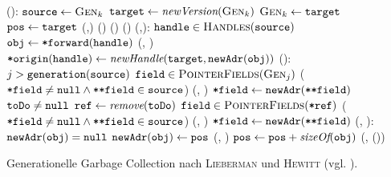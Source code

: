 \begin{algorithm}[h!]
\begin{algorithmic}[1]
	\State {}():
	\State \quad $\texttt{source} \gets \textsc{Gen}_k$
	\State \quad $\texttt{target} \gets \textit{newVersion}(\textsc{Gen}_k)$		
	\State \quad $\textsc{Gen}_k \gets \texttt{target}$
	\State \quad $\texttt{pos} \gets \texttt{target}$
	\State \quad {}(,)		
	\State \quad {}()		
	\State \quad {}()
	\State \quad {}()		
	\Statex
	\State {}(,):
	\State \quad \FOREACH $\texttt{handle} \in \textsc{Handles}(\texttt{source})$		
	\State \quad \quad $\texttt{obj} \gets \texttt{*forward}(\texttt{handle})$
	\State \quad \quad {}(, )
	\State \quad \quad $\texttt{*origin}(\texttt{handle}) \gets \textit{newHandle}(\texttt{target}, \texttt{newAdr}(\texttt{obj}))$
	\Statex
	\State {}():
	\State \quad \FOREACH $j > \texttt{generation}(\texttt{source})$		
	\State \quad \quad \FOREACH $\texttt{field} \in \textsc{PointerFields}(\textsc{Gen}_j)$	
	\State \quad \quad \quad \IF ($\texttt{*field} \neq \texttt{null} \wedge \texttt{**field} \in \texttt{source}$)
	\State \quad \quad \quad \quad {}(, )
	\State \quad \quad \quad \quad $\texttt{*field} \gets \texttt{newAdr}(\texttt{**field})$
	\State \quad \WHILE $\texttt{toDo} \neq \texttt{null}$
	\State \quad \quad $\texttt{ref} \gets \textit{remove}(\texttt{toDo})$
	\State \quad \quad \FOREACH $\texttt{field} \in \textsc{PointerFields}(\texttt{*ref})$	
	\State \quad \quad \quad \IF ($\texttt{*field} \neq \texttt{null} \wedge \texttt{**field} \in \texttt{source}$)
	\State \quad \quad \quad \quad {}(, )
	\State \quad \quad \quad \quad $\texttt{*field} \gets \texttt{newAdr}(\texttt{**field})$
	\Statex
	\State {}(, ):
	\State \quad \IF $\texttt{newAdr}(\texttt{obj}) = \texttt{null}$		
	\State \quad \quad $\texttt{newAdr}(\texttt{obj}) \gets \texttt{pos}$
	\State \quad \quad {}(, )
	\State \quad \quad $\texttt{pos} \gets \texttt{pos} + \textit{sizeOf}(\texttt{obj})$
	\State \quad \quad {}(, ())
\end{algorithmic}
\caption[Generationelle Garbage Collection nach \textsc{Lieberman} und \textsc{Hewitt}]{Generationelle Garbage Collection nach \textsc{Lieberman} und \textsc{Hewitt} (vgl. \cite[S. 421ff]{lieberman1983}).}
\label{algo:lieberman}
\end{algorithm}


